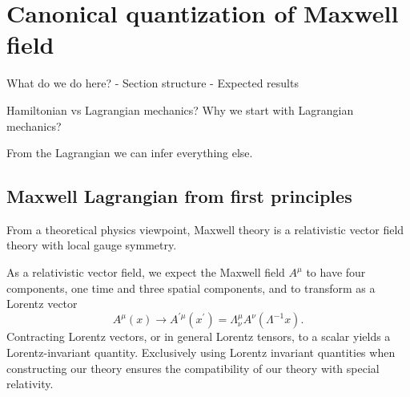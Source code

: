 \section{Canonical quantization of Maxwell field}

What do we do here?
- Section structure
- Expected results

Hamiltonian vs Lagrangian mechanics?
Why we start with Lagrangian mechanics?

From the Lagrangian we can infer everything else.

\subsection{Maxwell Lagrangian from first principles}

From a theoretical physics viewpoint, Maxwell theory is a relativistic vector field theory with local gauge symmetry.

As a relativistic vector field, we expect the Maxwell field $A^\mu$ to have four components, one time and three spatial components, and to transform as a Lorentz vector~\cite[p.~37]{Peskin1995}
\begin{equation}
	A^\mu(x)
	\to
	A^{\prime\mu}(x^\prime)
	=
	\Lambda^\mu_\nu
	A^\nu(\Lambda^{-1}x)
	.
\end{equation}
Contracting Lorentz vectors, or in general Lorentz tensors, to a scalar yields a Lorentz-invariant quantity.
Exclusively using Lorentz invariant quantities when constructing our theory ensures the compatibility of our theory with special relativity.

